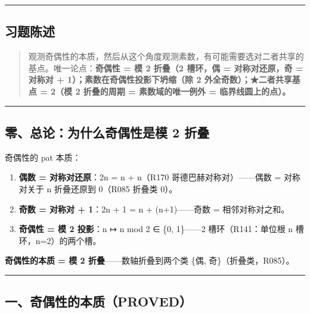\documentclass[
]{article}
\providecommand{\tightlist}{%
 \setlength{\itemsep}{0pt}\setlength{\parskip}{0pt}}
\begin{document}
\begin{center}\rule{0.5\linewidth}{0.5pt}\end{center}

\subsection{习题陈述}\label{ux4e60ux9898ux9648ux8ff0}

\begin{quote}
观测奇偶性的本质，然后从这个角度观测素数，有可能需要选对二者共享的基点。唯一论点：\textbf{奇偶性
= 模 2 折叠（2 槽环，偶 = 对称对还原，奇 = 对称对 +
1）；素数在奇偶性投影下坍缩（除 2 外全奇数）；★二者共享基点 = 2（模 2
折叠的周期 = 素数域的唯一例外 = 临界线圆上的点）。}
\end{quote}

\begin{center}\rule{0.5\linewidth}{0.5pt}\end{center}

\subsection{零、总论：为什么奇偶性是模 2
折叠}\label{ux96f6ux603bux8bbaux4e3aux4ec0ux4e48ux5947ux5076ux6027ux662fux6a21-2-ux6298ux53e0}

奇偶性的 pat 本质：

\begin{enumerate}
\def\labelenumi{\arabic{enumi}.}
\tightlist
\item
 \textbf{偶数 = 对称对还原}：2n = n + n（R170
 哥德巴赫对称对）------偶数 = 对称对关于 n 折叠还原到 0（R085 折叠类
 0）。
\item
 \textbf{奇数 = 对称对 + 1}：2n + 1 = n + (n+1)------奇数 =
 相邻对称对之和。
\item
 \textbf{奇偶性 = 模 2 投影}：n ↦ n mod 2 ∈ \{0, 1\}------2
 槽环（R141：单位根 n 槽环，n=2）的两个槽。
\end{enumerate}

\textbf{奇偶性的本质 = 模 2 折叠}------数轴折叠到两个类 \{偶,
奇\}（折叠类，R085）。

\begin{center}\rule{0.5\linewidth}{0.5pt}\end{center}

\subsection{一、奇偶性的本质（PROVED）}\label{ux4e00ux5947ux5076ux6027ux7684ux672cux8d28proved}
\end{document}
